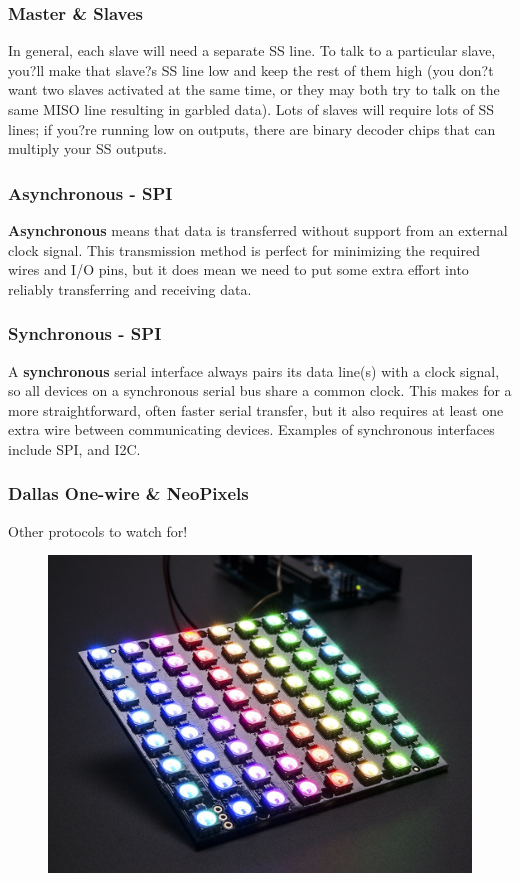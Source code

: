 \begin{frame}
	\frametitle{Master \& Slaves}
In general, each slave will need a separate SS line. To talk to a particular slave, you?ll make that slave?s SS line low and keep the rest of them high (you don?t want two slaves activated at the same time, or they may both try to talk on the same MISO line resulting in garbled data). Lots of slaves will require lots of SS lines; if you?re running low on outputs, there are binary decoder chips that can multiply your SS outputs.
\end{frame}



\begin{frame}
	\frametitle{Asynchronous - SPI}
	\textbf{Asynchronous} means that data is transferred without support from an external clock signal. This transmission method is perfect for minimizing the required wires and I/O pins, but it does mean we need to put some extra effort into reliably transferring and receiving data.
\end{frame}


\begin{frame}
	\frametitle{Synchronous - SPI}
	A \textbf{synchronous} serial interface always pairs its data line(s) with a clock signal, so all devices on a synchronous serial bus share a common clock. This makes for a more straightforward, often faster serial transfer, but it also requires at least one extra wire between communicating devices. Examples of synchronous interfaces include SPI, and I2C.

\end{frame}

\begin{frame}
	\frametitle{Dallas One-wire \& NeoPixels}
	Other protocols to watch for!
	\begin{figure}
		\includegraphics[scale=.4]{assets/neo}  
	\end{figure}

\end{frame}


